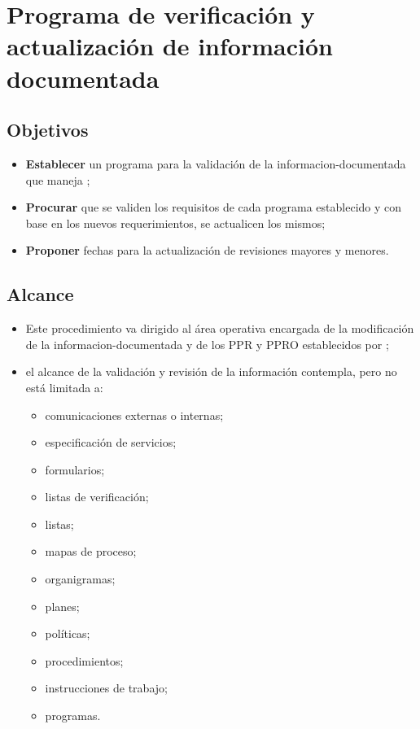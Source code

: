 \thispagestyle{formato-PI}
\renewcommand{\MayorVer}{1}
\renewcommand{\MenorVer}{0}
\renewcommand{\Codigo}{BPD-11-PRO}
\renewcommand{\FechaPub}{2023--01}
\renewcommand{\Titulo}{Programa de verificación y actualización de información documentada}

\section{\Titulo}
\label{informacion.actualizacion}

\subsection{Objetivos}
\begin{itemize}
    \item \textbf{Establecer} un programa para la validación de la \gls{informacion-documentada} que maneja ;
    \item \textbf{Procurar} que se validen los requisitos de cada programa establecido y con base en los nuevos requerimientos, se actualicen los mismos;
    \item \textbf{Proponer} fechas para la actualización de revisiones mayores y menores.
\end{itemize}

\subsection{Alcance}
\begin{itemize}
    \item Este procedimiento va dirigido al área operativa encargada de la modificación de la \gls{informacion-documentada} y de los \gls{PPR} y \gls{PPRO} establecidos por ;
    \item el alcance de la validación y revisión de la información contempla, pero no está limitada a:
          \begin{itemize}
              \item comunicaciones externas o internas;
              \item especificación de servicios;
              \item formularios;
              \item listas de verificación;
              \item listas;
              \item mapas de proceso;
              \item organigramas;
              \item planes;
              \item políticas;
              \item procedimientos;
              \item instrucciones de trabajo;
              \item programas.
          \end{itemize}
\end{itemize}

